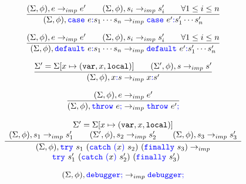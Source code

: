 \documentclass[a4paper]{article}
\newcommand{\code}[1]{\textcolor{blue}{\tt #1}}
\newcommand{\var}{{\tt{var}}}
\newcommand{\local}{{\tt{local}}}
\begin{document}
\begin{equation*}
\frac{
    (\Sigma, \phi), e \rightarrow_{imp} e' \qquad
    (\Sigma, \phi), s_i \rightarrow_{imp} s'_i \qquad \forall 1 \le i \le n
}{
    (\Sigma, \phi), \code{case}\ e \code{:} s_1 \cdots s_n \rightarrow_{imp} \code{case}\ e' \code{:} s'_1 \cdots s'_n
}
\end{equation*}

\begin{equation*}
\frac{
    (\Sigma, \phi), e \rightarrow_{imp} e' \qquad
    (\Sigma, \phi), s_i \rightarrow_{imp} s'_i \qquad \forall 1 \le i \le n
}{
    (\Sigma, \phi), \code{default}\ e \code{:} s_1 \cdots s_n \rightarrow_{imp} \code{default}\ e' \code{:} s'_1 \cdots s'_n
}
\end{equation*}

\begin{equation*}
\frac{
    \Sigma' = \Sigma [x \mapsto (\var, x, \local)] \qquad
    (\Sigma', \phi), s \rightarrow_{imp} s'
}{
    (\Sigma, \phi), x \code{:} s \rightarrow_{imp} x \code{:} s'
}
\end{equation*}

\begin{equation*}
\frac{
    (\Sigma, \phi), e \rightarrow_{imp} e'
}{
    (\Sigma, \phi), \code{throw}\ e \code{;} \rightarrow_{imp} \code{throw}\ e' \code{;}
}
\end{equation*}

\begin{equation*}
\frac{
    \begin{array}{c}
    \Sigma' = \Sigma [x \mapsto (\var, x, \local)] \\
    (\Sigma, \phi), s_1 \rightarrow_{imp} s'_1 \qquad
    (\Sigma', \phi), s_2 \rightarrow_{imp} s'_2 \qquad
    (\Sigma, \phi), s_3 \rightarrow_{imp} s'_3
    \end{array}
}{
    \begin{array}{l}
    (\Sigma, \phi), \code{try}\ s_1\ (\code{catch}\ \code{(} x \code{)}\ s_2)\ (\code{finally}\ s_3) \rightarrow_{imp} \\
    \qquad \code{try}\ s'_1\ (\code{catch}\ \code{(} x \code{)}\ s'_2)\ (\code{finally}\ s'_3)
    \end{array}
}
\end{equation*}

\begin{equation*}
(\Sigma, \phi), \code{debugger;} \rightarrow_{imp} \code{debugger;}
\end{equation*}
\end{document}
